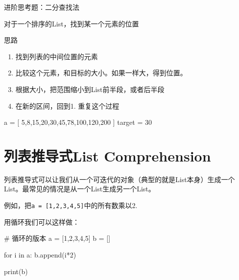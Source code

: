 \documentclass[
  letterpaper,
  DIV=11,
  numbers=noendperiod]{scrreprt}
\newenvironment{Shaded}{\begin{snugshade}}{\end{snugshade}}
\newcommand{\BuiltInTok}[1]{\textcolor[rgb]{0.00,0.23,0.31}{#1}}
\newcommand{\CommentTok}[1]{\textcolor[rgb]{0.37,0.37,0.37}{#1}}
\newcommand{\ControlFlowTok}[1]{\textcolor[rgb]{0.00,0.23,0.31}{#1}}
\newcommand{\DecValTok}[1]{\textcolor[rgb]{0.68,0.00,0.00}{#1}}
\newcommand{\KeywordTok}[1]{\textcolor[rgb]{0.00,0.23,0.31}{#1}}
\newcommand{\NormalTok}[1]{\textcolor[rgb]{0.00,0.23,0.31}{#1}}
\newcommand{\OperatorTok}[1]{\textcolor[rgb]{0.37,0.37,0.37}{#1}}
\providecommand{\tightlist}{%
  \setlength{\itemsep}{0pt}\setlength{\parskip}{0pt}}\usepackage{longtable,booktabs,array}
\begin{document}
进阶思考题：二分查找法

对于一个排序的List，找到某一个元素的位置

思路

\begin{enumerate}
\def\labelenumi{\arabic{enumi}.}
\tightlist
\item
  找到列表的中间位置的元素
\item
  比较这个元素，和目标的大小。如果一样大，得到位置。
\item
  根据大小，把范围缩小到List前半段，或者后半段
\item
  在新的区间，回到1. 重复这个过程
\end{enumerate}

\begin{Shaded}
\begin{Highlighting}[]
\NormalTok{a }\OperatorTok{=}\NormalTok{ [ }\DecValTok{5}\NormalTok{,}\DecValTok{8}\NormalTok{,}\DecValTok{15}\NormalTok{,}\DecValTok{20}\NormalTok{,}\DecValTok{30}\NormalTok{,}\DecValTok{45}\NormalTok{,}\DecValTok{78}\NormalTok{,}\DecValTok{100}\NormalTok{,}\DecValTok{120}\NormalTok{,}\DecValTok{200}\NormalTok{ ]}
\NormalTok{target }\OperatorTok{=} \DecValTok{30}
\end{Highlighting}
\end{Shaded}

\hypertarget{ux5217ux8868ux63a8ux5bfcux5f0flist-comprehension}{%
\section{列表推导式List
Comprehension}\label{ux5217ux8868ux63a8ux5bfcux5f0flist-comprehension}}

列表推导式可以让我们从一个可迭代的对象（典型的就是List本身）生成一个List。最常见的情况是从一个List生成另一个List。

例如，把\texttt{a\ =\ {[}1,2,3,4,5{]}}中的所有数乘以2.

用循环我们可以这样做：

\begin{Shaded}
\begin{Highlighting}[]
\CommentTok{\# 循环的版本}
\NormalTok{a }\OperatorTok{=}\NormalTok{ [}\DecValTok{1}\NormalTok{,}\DecValTok{2}\NormalTok{,}\DecValTok{3}\NormalTok{,}\DecValTok{4}\NormalTok{,}\DecValTok{5}\NormalTok{]}
\NormalTok{b }\OperatorTok{=}\NormalTok{ []}

\ControlFlowTok{for}\NormalTok{ i }\KeywordTok{in}\NormalTok{ a:}
\NormalTok{    b.append(i}\OperatorTok{*}\DecValTok{2}\NormalTok{) }

\BuiltInTok{print}\NormalTok{(b)}
\end{Highlighting}
\end{Shaded}
\end{document}
